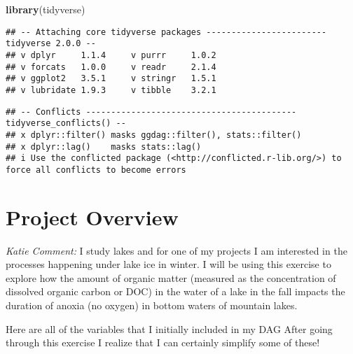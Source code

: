 \documentclass[]{article}
\newenvironment{Shaded}{\begin{snugshade}}{\end{snugshade}}
\newcommand{\KeywordTok}[1]{\textcolor[rgb]{0.13,0.29,0.53}{\textbf{#1}}}
\newcommand{\NormalTok}[1]{#1}
\begin{document}
\begin{Shaded}
\begin{Highlighting}[]
\KeywordTok{library}\NormalTok{(tidyverse)}
\end{Highlighting}
\end{Shaded}

\begin{verbatim}
## -- Attaching core tidyverse packages ------------------------ tidyverse 2.0.0 --
## v dplyr     1.1.4     v purrr     1.0.2
## v forcats   1.0.0     v readr     2.1.4
## v ggplot2   3.5.1     v stringr   1.5.1
## v lubridate 1.9.3     v tibble    3.2.1
\end{verbatim}

\begin{verbatim}
## -- Conflicts ------------------------------------------ tidyverse_conflicts() --
## x dplyr::filter() masks ggdag::filter(), stats::filter()
## x dplyr::lag()    masks stats::lag()
## i Use the conflicted package (<http://conflicted.r-lib.org/>) to force all conflicts to become errors
\end{verbatim}

\hypertarget{project-overview}{%
\section{Project Overview}\label{project-overview}}

{ \emph{Katie Comment:} I study lakes and for one of my projects I am
interested in the processes happening under lake ice in winter. I will
be using this exercise to explore how the amount of organic matter
(measured as the concentration of dissolved organic carbon or DOC) in
the water of a lake in the fall impacts the duration of anoxia (no
oxygen) in bottom waters of mountain lakes. }

{ Here are all of the variables that I initially included in my DAG
After going through this exercise I realize that I can certainly
simplify some of these! }
\end{document}
